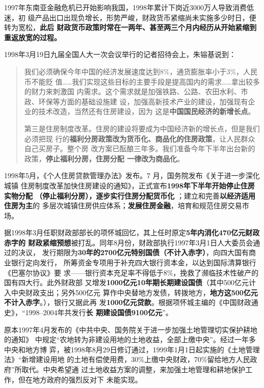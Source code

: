 1997年东南亚金融危机已开始影响我国，1998年累计下岗近3000万人导致消费低迷，初
级产品出口出现负增长，形势严峻，财政货币紧缩尚未实施多少时日，便转为宽松，\textbf{此后
  财政货币政策时常在一两年、甚至两三个月内经历从开始紧缩到重返放宽的过程。}


1998年3月19日九届全国人大一次会议举行的记者招待会上，朱镕基说到：
\begin{quotation}
  我们必须确保今年中国的经济发展速度达到8\%，通货膨胀率小于3\%，人民币不能贬
  值……我们实现这些目标的主要手段是提高国内的需求……拿出较多的财力来刺激国
  内需求。这个需求就是加强铁路、公路、农田水利、市政、环保等方面的基础设施建
  设，加强高新技术产业的建设，加强现有企业的技术改造，当然还有住房建设，因为
  这是\textbf{中国国民经济的新增长点}。


  第三是住房制度改革。住房的建设将要成为中国经济新的增长点，但是我们必须把现
  行的\textbf{福利分房政策改为货币化、商品化的住房政策}，让人民群众自己买房子。整个房
  改方案已酝酿三年多。我们准备今年下半年出台新的政策，\textbf{停止福利分房，住房分配
  一律改为商品化}。
\end{quotation}

1998年5月，《个人住房贷款管理办法》发布。7 月，国务院发布《关于进一步深化城镇
住房制度改革加快住房建设的通知》，正式宣布\textbf{1998年下半年开始停止住房实物分配
  （停止福利分房），逐步实行住房分配货币化} ；建立和完善\textbf{以经济适用住房为主}的
多层次城镇住房供应体系；\textbf{发展住房金融}，培育和规范住房交易市场。

据1998年3月任职财政部部长的项怀城回忆，其上任时原定\textbf{5年内消化470亿元财政赤字的
  财政紧缩预想}被打乱。同年8月份，财政部执行1997年3月1日人大委员会通过的决议，
发行期限为\textbf{30年的2700亿元特别国债（不计入赤字）}，向四大国有商业银行定向发行，
所筹资金专项用于补充四大银行资本金，以达到国际清算银行《巴塞尔协议》要
求——银行资本充足率不得低于8\%，挽救了濒临技术性破产的国有四大行。此外财政部
又增发\textbf{1000亿元10年期长期建设国债}（其中500亿元计入中央财政支出；另外500亿元
算作中央替地方发债，转拨地方，\textbf{地方这500亿元不计入赤字}。），银行又据此再
发\textbf{1000亿元贷款}。根据项怀城主编的《中国财政通史》，“1998--2004年共发行\textbf{长
  期建设国债9100亿元}”。


原本1997年4月发布的《中共中央、国务院关于进一步加强土地管理切实保护耕地的通知》
中规定“农地转为非建设用地的土地收益，全部上缴中央”。经过一年多中央和地方博
弈，被1998年8月29日修订通过，1999年1月1日起实施的《土地管理法》“新增建设用地
的土地有偿使用费，30\%上缴中央财政，70\%留给地方人民政府”所取代。中央希望通
过土地收益方案的调整，来加强土地管理和耕地保护工作，但在地方政府的强烈反对下
未能实现。\cite{ZDJJ200804009}

